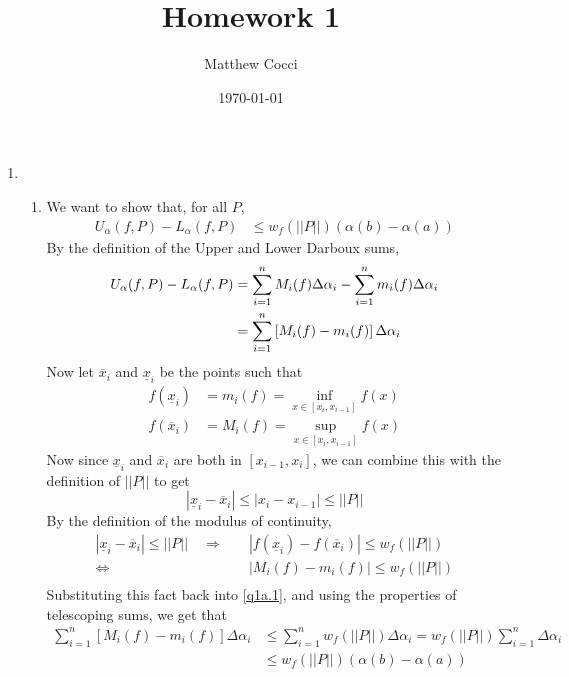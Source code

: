 \documentclass[12pt]{article}
\author{Matthew Cocci}
\title{\textbf{Homework 1}}
\date{\today}
\theoremstyle{plain}
\theoremstyle{definition}
\theoremstyle{remark}
\begin{document}
\maketitle


\begin{enumerate}

\item 
    \begin{enumerate}
        \item We want to show that, for all $P$, 
        \begin{align*}
            U_\alpha(f, P) - L_\alpha(f,P) &\leq 
                w_f\left(||P||\right) (\alpha(b) - \alpha(a)) 
        \end{align*}
        By the definition of the Upper and Lower Darboux sums,
        \begin{align}
            U_\alpha(f, P) - L_\alpha(f,P) &= 
            \sum^n_{i=1} M_i(f)\Delta\alpha_i - 
            \sum^n_{i=1} m_i(f)\Delta\alpha_i \notag \\
            &= \sum^n_{i=1} \left[M_i(f) - m_i(f)\right]
            \Delta\alpha_i \label{q1a.1}
        \end{align}
        Now let $\overline{x}_i$ and $\underline{x}_i$ be the 
        points such that 
        \begin{align*}
            f(\underline{x}_i) &= m_i(f) 
                = \inf_{x\in [x_i, x_{i-1}]} f(x)\\
            f(\overline{x}_i) &= M_i(f)
                = \sup_{x\in [x_i, x_{i-1}]} f(x)
        \end{align*}
        Now since $\underline{x}_i$ and $\overline{x}_i$ are
        both in $[x_{i-1}, x_i]$, we can combine this with
        the definition of $||P||$ to get
            \[ |\underline{x}_i - \overline{x}_i| \leq
                |x_i - x_{i-1}| \leq ||P|| \]
        By the definition of the modulus of continuity, 
        \begin{align*}
            |\underline{x}_i - \overline{x}_i| \leq
                ||P|| \quad \Rightarrow \quad
                &|f(\underline{x}_i) - f(\overline{x}_i)| 
                \leq w_f\left(||P||\right)  \\
            \Leftrightarrow \quad &|M_i(f) - m_i(f)| 
                \leq w_f\left(||P||\right)  \\
        \end{align*}
        Substituting this fact back into \ref{q1a.1}, and 
        using the properties of telescoping sums, we get that
        \begin{align*}
            \sum^n_{i=1} \left[M_i(f) - m_i(f)\right]
            \Delta\alpha_i 
            &\leq  \sum^n_{i=1} w_f\left(||P||\right) 
            \Delta\alpha_i = 
            w_f\left(||P||\right) \sum^n_{i=1} \Delta\alpha_i\\
            &\leq w_f\left(||P||\right) (\alpha(b)-\alpha(a)) 
        \end{align*}
                


\end{enumerate}
\end{enumerate}
\end{document}
